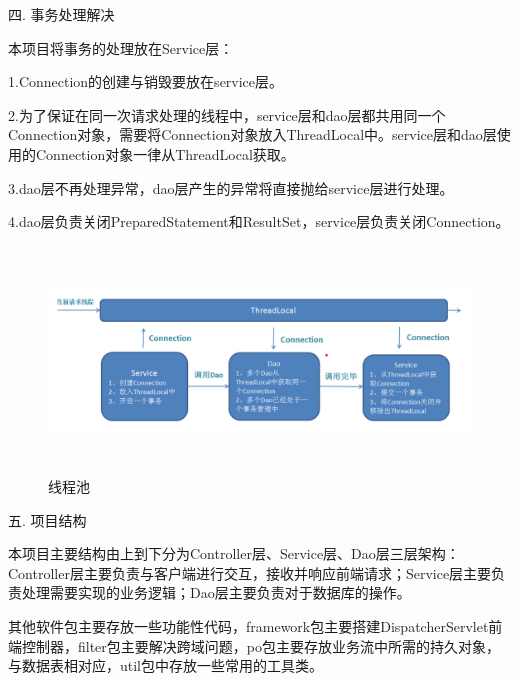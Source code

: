 \noindent
四. 事务处理解决

本项目将事务的处理放在Service层：

1.Connection的创建与销毁要放在service层。

2.为了保证在同一次请求处理的线程中，service层和dao层都共用同一个Connection对象，需要将Connection对象放入ThreadLocal中。service层和dao层使用的Connection对象一律从ThreadLocal获取。

3.dao层不再处理异常，dao层产生的异常将直接抛给service层进行处理。

4.dao层负责关闭PreparedStatement和ResultSet，service层负责关闭Connection。

\begin{figure}[H]
    \centering
    \includegraphics[width=15cm,height=6cm]{figures/thread.png}
    \caption{线程池}
\end{figure}

\noindent
五. 项目结构

本项目主要结构由上到下分为Controller层、Service层、Dao层三层架构：Controller层主要负责与客户端进行交互，接收并响应前端请求；Service层主要负责处理需要实现的业务逻辑；Dao层主要负责对于数据库的操作。

其他软件包主要存放一些功能性代码，framework包主要搭建DispatcherServlet前端控制器，filter包主要解决跨域问题，po包主要存放业务流中所需的持久对象，与数据表相对应，util包中存放一些常用的工具类。

